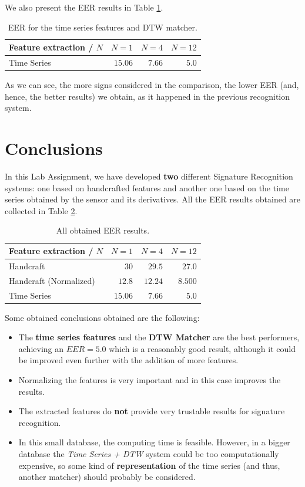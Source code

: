 \documentclass[a4paper]{article}
\begin{document}
{We also present the EER results in Table \ref{res:extra:table}.
\begin{table}[H]
  \centering
\begin{tabular}{l|rrr}
Feature extraction / $N$ & $N = 1$ & $N=4$   & $N = 12$ \\ \hline
Time Series                      & $15.06$  & $7.66$ & $5.0$   
\end{tabular}
\caption{EER for the time series features and DTW matcher.}
\label{res:extra:table}
\end{table}

As we can see, the more signs considered in the comparison, the lower EER (and, hence, the better results) we obtain, as it happened in the previous recognition system.\\


\section{Conclusions}

In this Lab Assignment, we have developed \textbf{two} different Signature Recognition systems: one based on handcrafted features and another one based on the time series obtained by the sensor and its derivatives. All the EER results obtained are collected in Table \ref{table:res:ALL}.

\begin{table}[H]
  \centering
\begin{tabular}{l|rrr}
Feature extraction / $N$ & $N = 1$ & $N=4$  & $N = 12$ \\ \hline
Handcraft                & $30$    & $29.5$ & $27.0$  \\
Handcraft (Normalized) & $12.8$ & $12.24$ & $8.500$ \\
Time Series                      & $15.06$  & $7.66$ & $\mathbf{5.0}$  
\end{tabular}
\caption{All obtained EER results.}
\label{table:res:ALL}
\end{table}

Some obtained conclusions obtained are the following:

\begin{itemize}
\item The \textbf{time series features} and the \textbf{DTW Matcher} are the best performers, achieving an \(EER = 5.0\) which is a reasonably good result, although it could be improved even further with the addition of more features.
\item Normalizing the features is very important and in this case improves the results.
\item The extracted features do \textbf{not} provide very trustable results for signature recognition.
\item In this small database, the computing time is feasible. However, in a bigger database the \emph{Time Series + DTW} system could be too computationally expensive, so some kind of \textbf{representation} of the time series (and thus, another matcher) should probably be considered.
\end{itemize}

}
\end{document}
